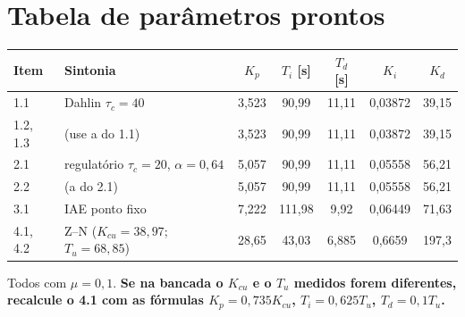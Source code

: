 \documentclass[11pt,a4paper]{article}
\begin{document}
\section{Tabela de parâmetros prontos}\label{tabpar}
\begin{center}\small
\begin{tabular}{llccccc}\toprule Item & Sintonia & $K_p$ & $T_i$ [s] & $T_d$ [s] & $K_i$ & $K_d$\\\midrule
1.1 & Dahlin $\tau_c=40$ & 3,523 & 90,99 & 11,11 & 0,03872 & 39,15\\
1.2, 1.3 & (use a do 1.1) & 3,523 & 90,99 & 11,11 & 0,03872 & 39,15\\
2.1 & regulatório $\tau_c=20$, $\alpha=0{,}64$ & 5,057 & 90,99 & 11,11 & 0,05558 & 56,21\\
2.2 & (a do 2.1) & 5,057 & 90,99 & 11,11 & 0,05558 & 56,21\\
3.1 & IAE ponto fixo & 7,222 & 111,98 & 9,92 & 0,06449 & 71,63\\
4.1, 4.2 & Z--N ($K_{cu}=38{,}97$; $T_u=68{,}85$) & 28,65 & 43,03 & 6,885 & 0,6659 & 197,3\\\bottomrule
\end{tabular}\end{center}
Todos com $\mu=0{,}1$. \textbf{Se na bancada o $K_{cu}$ e o $T_u$ medidos forem diferentes, recalcule o 4.1 com as fórmulas $K_p=0{,}735K_{cu}$, $T_i=0{,}625T_u$, $T_d=0{,}1T_u$.}
\end{document}
